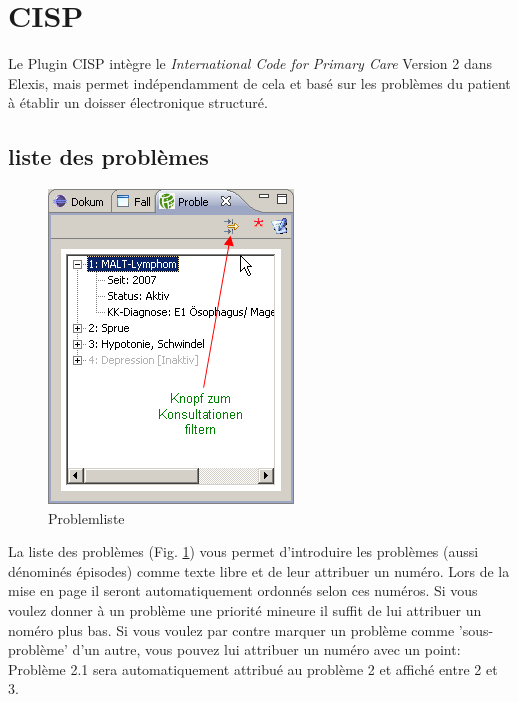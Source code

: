 
\section{CISP}
Le Plugin CISP intègre le \textit{International Code for Primary Care} Version 2 dans Elexis, mais permet indépendamment de cela et basé sur les problèmes du patient à établir un doisser électronique structuré.
\subsection{liste des problèmes}
\begin{figure}
  \includegraphics{images/problemliste1}
  \caption{Problemliste}\label{fig:problemliste}
\end{figure}

La liste des problèmes (Fig. \ref{fig:problemliste}) vous permet d'introduire les problèmes (aussi dénominés épisodes) comme texte libre et de leur attribuer un numéro. Lors de la mise en page il seront automatiquement ordonnés selon ces numéros. Si vous voulez donner à un problème une priorité mineure il suffit de lui attribuer un noméro plus bas. Si vous voulez par contre marquer un problème comme 'sous-problème' d'un autre, vous pouvez lui attribuer un numéro avec un point: Problème 2.1 sera automatiquement attribué au problème 2 et affiché entre 2 et 3.

